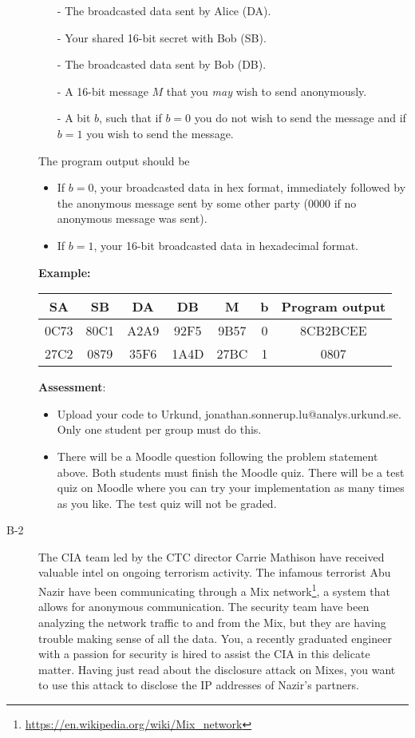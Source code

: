 \documentclass{article}
\begin{document}
\begin{description}
{\begin{itemize}
		\item[-] The broadcasted data sent by Alice (DA).
		\item[-] Your shared 16-bit secret with Bob (SB).
		\item[-] The broadcasted data sent by Bob (DB).
		\item[-] A 16-bit message $M$ that you \textit{may} wish to send anonymously.
		\item[-] A bit $b$, such that if $b=0$ you do not wish to send the message and if $b=1$ you wish to send the message.
	\end{itemize}
	The program output should be
	\begin{itemize}
	\item If $b=0$, your broadcasted data in hex format, immediately followed by the anonymous message sent by some other party (0000 if no anonymous message was sent).
	\item If $b=1$, your 16-bit broadcasted data in hexadecimal format.
	\end{itemize}
	\textbf{Example:}\\
	\begin{center}
	\begin{tabular}{|c|c|c|c|c|c||c|}\hline
		\textbf{SA} & \textbf{SB} & \textbf{DA} & \textbf{DB} & \textbf{M} & \textbf{b} & \textbf{Program output}\\\hline
		0C73 & 80C1 & A2A9 & 92F5 & 9B57 & 0 & 8CB2BCEE\\\hline
		27C2 & 0879 & 35F6 & 1A4D & 27BC & 1 & 0807\\\hline
		
	\end{tabular}
	\end{center}
	\noindent\textbf{Assessment}:
	\begin{itemize}
		\item Upload your code to Urkund, jonathan.sonnerup.lu@analys.urkund.se. Only one student per group must do this.
		\item There will be a Moodle question following the problem statement above. Both students must finish the Moodle quiz. There will be	a test quiz on Moodle where you can try your implementation as many times as you like. The test quiz will not be graded.
	\end{itemize}
	}
	

	\item[B-2]{The CIA team led by the CTC director Carrie Mathison have received valuable intel on ongoing terrorism activity.
		The infamous terrorist Abu Nazir have been communicating through a Mix network\footnote{\url{https://en.wikipedia.org/wiki/Mix_network}}, 
		a system that allows for anonymous communication. The security team have been analyzing the network traffic to and from the Mix, but
		they are having trouble making sense of all the data. You, a recently graduated engineer with a passion for security is hired to assist
		the CIA in this delicate matter. Having just read about the disclosure attack on Mixes, you want to use this attack to disclose the
		IP addresses of Nazir's partners. 
		
}
\end{description}
\end{document}
